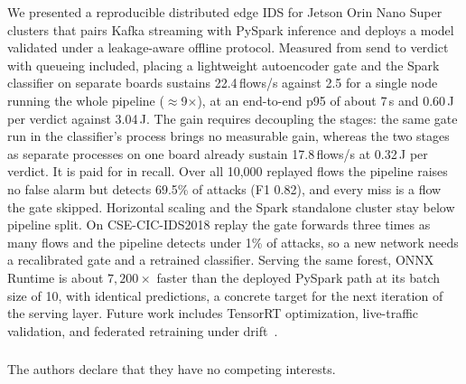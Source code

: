\documentclass[runningheads]{llncs}
\begin{document}
We presented a reproducible distributed edge IDS for Jetson Orin Nano Super clusters that pairs Kafka streaming with PySpark inference and deploys a model validated under a leakage-aware offline protocol. Measured from send to verdict with queueing included, placing a lightweight autoencoder gate and the Spark classifier on separate boards sustains 22.4\,flows/s against 2.5 for a single node running the whole pipeline ($\approx$9$\times$), at an end-to-end p95 of about 7\,s and 0.60\,J per verdict against 3.04\,J. The gain requires decoupling the stages: the same gate run in the classifier's process brings no measurable gain, whereas the two stages as separate processes on one board already sustain 17.8\,flows/s at 0.32\,J per verdict. It is paid for in recall. Over all 10{,}000 replayed flows the pipeline raises no false alarm but detects 69.5\% of attacks (F1 0.82), and every miss is a flow the gate skipped. Horizontal scaling and the Spark standalone cluster stay below pipeline split. On CSE-CIC-IDS2018 replay the gate forwards three times as many flows and the pipeline detects under 1\% of attacks, so a new network needs a recalibrated gate and a retrained classifier. Serving the same forest, ONNX Runtime is about $7{,}200\times$ faster than the deployed PySpark path at its batch size of 10, with identical predictions, a concrete target for the next iteration of the serving layer. Future work includes TensorRT optimization, live-traffic validation, and federated retraining under drift~\cite{hernandezramos2025federated}.

\begin{credits}
\subsubsection{\discintname}
The authors declare that they have no competing interests.
\end{credits}



\end{document}
